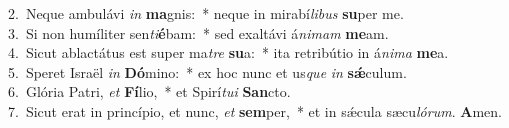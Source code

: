 {2.~}Neque ambulávi \textit{in} \textbf{ma}gnis:~* neque in mirabí\textit{li}\textit{bus} \textbf{su}per me.\\
{3.~}Si non humíliter sen\textit{ti}\textbf{é}bam:~* sed exaltávi á\textit{ni}\textit{mam} \textbf{me}am.\\
{4.~}Sicut ablactátus est super ma\textit{tre} \textbf{su}a:~* ita retribútio in á\textit{ni}\textit{ma} \textbf{me}a.\\
{5.~}Speret Israël \textit{in} \textbf{Dó}mino:~* ex hoc nunc et us\textit{que} \textit{in} \textbf{sǽ}culum.\\
{6.~}Glória Patri, \textit{et} \textbf{Fí}lio,~* et Spirí\textit{tu}\textit{i} \textbf{San}cto.\\
{7.~}Sicut erat in princípio, et nunc, \textit{et} \textbf{sem}per,~* et in sǽcula sæcu\textit{ló}\textit{rum}. \textbf{A}men.\\
